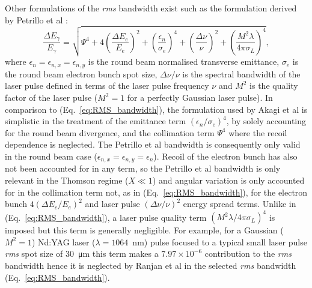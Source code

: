 \documentclass[../main.tex]{subfiles}
\begin{document}
Other formulations of the \textit{rms} bandwidth exist such as the formulation derived by Petrillo et al \cite{petrillo2012photon,akagi2016narrow}:
\begin{equation}
\frac{\Delta E_{\gamma}}{E_{\gamma}} = \sqrt{\Psi^{4}+4\left(\frac{\Delta E_{e}}{E_{e}}\right)^{2}+\left(\frac{\epsilon_{n}}{\sigma_{e}}\right)^{4}+\left(\frac{\Delta\nu}{\nu}\right)^{2}+\left(\frac{M^{2}\lambda}{4\pi\sigma_{L}}\right)^{4}},
\label{eq:akagi_bandwidth}    
\end{equation}
where $\epsilon_{n}=\epsilon_{n,x}=\epsilon_{n,y}$ is the round beam normalised transverse emittance, $\sigma_{e}$ is the round beam electron bunch spot size, $\Delta\nu/\nu$ is the spectral bandwidth of the laser pulse defined in terms of the laser pulse frequency $\nu$ and $M^{2}$ is the quality factor of the laser pulse ($M^{2} = 1$ for a perfectly Gaussian laser pulse). In comparison to (Eq.~\ref{eq:RMS_bandwidth}), the formulation used by Akagi et al \cite{akagi2016narrow} is simplistic in the treatment of the emittance term $\left(\epsilon_{n}/\sigma_{e}\right)^{4}$, by solely accounting for the round beam divergence, and the collimation term $\Psi^{4}$ where the recoil dependence is neglected. The Petrillo et al bandwidth is consequently only valid in the round beam case ($\epsilon_{n,x} = \epsilon_{n,y} = \epsilon_{n}$). Recoil of the electron bunch has also not been accounted for in any term, so the Petrillo et al bandwidth is only relevant in the Thomson regime ($X \ll 1$) and angular variation is only accounted for in the collimation term not, as in (Eq.~\ref{eq:RMS_bandwidth}), for the electron bunch $4\left(\Delta E_{e}/E_{e}\right)^{2}$ and laser pulse $\left(\Delta\nu/\nu\right)^{2}$ energy spread terms. Unlike in (Eq.~\ref{eq:RMS_bandwidth}), a laser pulse quality term $\left(M^{2}\lambda/4\pi\sigma_{L}\right)^{4}$ is imposed but this term is generally negligible. For example, for a Gaussian ($M^{2}=1$) Nd:YAG laser ($\lambda = 1064$~\si{\nano\meter}) pulse focused to a typical small laser pulse \textit{rms} spot size of 30~\si{\micro\meter} this term makes a $7.97\times 10^{-6}$ contribution to the \textit{rms} bandwidth hence it is neglected by Ranjan et al \cite{ranjan2018simulation} in the selected \textit{rms} bandwidth (Eq.~\ref{eq:RMS_bandwidth}).   
\end{document}
